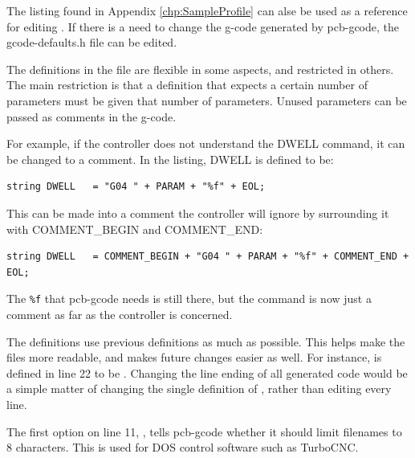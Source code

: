 \documentclass[11pt]{book}
\begin{document}
The listing found in Appendix \vref{chp:SampleProfile} can alse be used as a reference for editing . If there is a need to change the g-code generated by pcb-gcode, the gcode-defaults.h file can be edited.

The definitions in the file are flexible in some aspects, and restricted in others. The main restriction is that a definition that expects a certain number of parameters must be given that number of parameters. Unused parameters can be passed as comments in the g-code. 

For example, if the controller does not understand the DWELL command, it can be changed to a comment. In the listing, DWELL is defined to be:

\begin{lstlisting}[firstnumber=46]
string DWELL   = "G04 " + PARAM + "%f" + EOL;
\end{lstlisting}

This can be made into a comment the controller will ignore by surrounding it with COMMENT\_{}BEGIN and COMMENT\_{}END:

\begin{lstlisting}[firstnumber=46]
string DWELL   = COMMENT_BEGIN + "G04 " + PARAM + "%f" + COMMENT_END + EOL;
\end{lstlisting}

The \lstinline!%f! that pcb-gcode needs is still there, but the command is now just a comment as far as the controller is concerned.


The definitions use previous definitions as much as possible. This helps make the files more readable, and makes future changes easier as well. For instance,  is defined in line 22 to be . Changing the line ending of all generated code would be a simple matter of changing the single definition of , rather than editing every line.

The first option on line 11, , tells pcb-gcode whether it should limit filenames to 8 characters. This is used for DOS control software such as TurboCNC.
\end{document}
